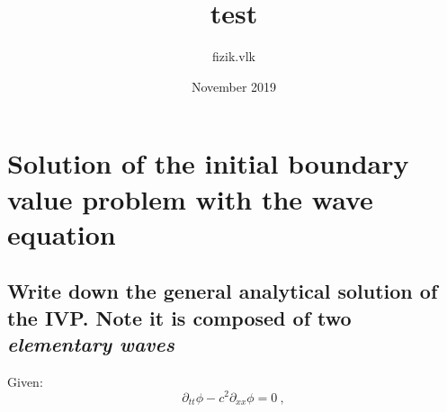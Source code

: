 \documentclass{article}
\title{test}
\author{fizik.vlk }
\date{November 2019}
\begin{document}
\maketitle

\section{Solution of the initial boundary value problem with the wave equation}
\subsection{Write down the general analytical solution of the IVP. Note it is composed of two \textit{elementary waves}}
Given: \\
\begin{equation}\label{eq:waveq:2}
\partial_{tt} \phi - c^2 \partial_{xx} \phi = 0  \ ,
\end{equation}
\end{document}
